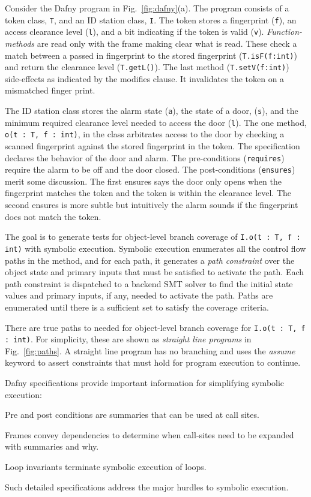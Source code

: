 \documentclass[11pt,onecolumn,notitlepage]{article}
\newcommand{\figref}[1]{Fig.~\ref{#1}}
\begin{document}
Consider the Dafny program in \figref{fig:dafny}(a). The program consists of a token class, \texttt{T}, and an ID station class, \texttt{I}. The token stores a fingerprint (\texttt{f}), an access clearance level (\texttt{l}), and a bit indicating if the token is valid (\texttt{v}). \emph{Function-methods} are read only with the frame making clear what is read. These check a match between a passed in fingerprint to the stored fingerprint (\texttt{T.isF(f:int)}) and return the clearance level (\texttt{T.getL()}). The last method (\texttt{T.setV(f:int)}) side-effects as indicated by the modifies clause. It invalidates the token on a mismatched finger print.

The ID station class stores the alarm state (\texttt{a}), the state of a door, (\texttt{s}), and the minimum required clearance level needed to access the door (\texttt{l}). The one method, \texttt{o(t : T, f : int)}, in the class arbitrates access to the door by checking a scanned fingerprint against the stored fingerprint in the token. The specification declares the behavior of the door and alarm. The pre-conditions (\texttt{requires}) require the alarm to be off and the door closed. The post-conditions (\texttt{ensures}) merit some discussion. The first ensures says the door only opens when the fingerprint matches the token and the token is within the clearance level. The second ensures is more subtle but intuitively the alarm sounds if the fingerprint does not match the token. 

The goal is to generate tests for object-level branch coverage of \texttt{I.o(t : T, f : int)} with symbolic execution. Symbolic execution enumerates all the control flow paths in the method, and for each path, it generates a \emph{path constraint} over the object state and primary inputs that must be satisfied to activate the path. Each path constraint is dispatched to a backend SMT solver to find the initial state values and primary inputs, if any, needed to activate the path. Paths are enumerated until there is a sufficient set to satisfy the coverage criteria.

There are true paths to needed for object-level branch coverage for \texttt{I.o(t : T, f : int)}. For simplicity, these are shown as \emph{straight line programs} in \figref{fig:paths}. A straight line program has no branching and uses the \emph{assume} keyword to assert constraints that must hold for program execution to continue. 

Dafny specifications provide important information for simplifying symbolic execution:
\begin{compactitem}
  \item Pre and post conditions are summaries that can be used at call sites.
  \item Frames convey dependencies to determine when call-sites need to be expanded with summaries and why.
  \item Loop invariants terminate symbolic execution of loops.
\end{compactitem}
Such detailed specifications address the major hurdles to symbolic execution.
\end{document}
